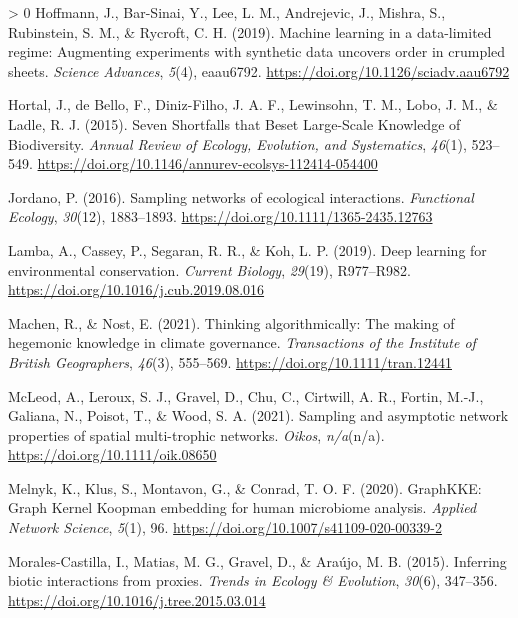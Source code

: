 \documentclass[11pt]{article}
\newlength{\cslhangindent}
\newenvironment{CSLReferences}[3] %
 {%
  \setlength{\parindent}{0pt}
  \ifodd #1 \everypar{\setlength{\hangindent}{\cslhangindent}}\ignorespaces\fi
  \ifnum #2 > 0
  \setlength{\parskip}{#2\baselineskip}
  \fi
 }%
 {}
\begin{document}
\begin{CSLReferences}{1}{0}
\leavevmode\hypertarget{ref-Hoffmann2019MacLea}{}%
Hoffmann, J., Bar-Sinai, Y., Lee, L. M., Andrejevic, J., Mishra, S.,
Rubinstein, S. M., \& Rycroft, C. H. (2019). Machine learning in a
data-limited regime: Augmenting experiments with synthetic data uncovers
order in crumpled sheets. \emph{Science Advances}, \emph{5}(4),
eaau6792. \url{https://doi.org/10.1126/sciadv.aau6792}

\leavevmode\hypertarget{ref-Hortal2015SevSho}{}%
Hortal, J., de Bello, F., Diniz-Filho, J. A. F., Lewinsohn, T. M., Lobo,
J. M., \& Ladle, R. J. (2015). Seven Shortfalls that Beset Large-Scale
Knowledge of Biodiversity. \emph{Annual Review of Ecology, Evolution,
and Systematics}, \emph{46}(1), 523--549.
\url{https://doi.org/10.1146/annurev-ecolsys-112414-054400}

\leavevmode\hypertarget{ref-Jordano2016SamNet}{}%
Jordano, P. (2016). Sampling networks of ecological interactions.
\emph{Functional Ecology}, \emph{30}(12), 1883--1893.
\url{https://doi.org/10.1111/1365-2435.12763}

\leavevmode\hypertarget{ref-Lamba2019DeeLea}{}%
Lamba, A., Cassey, P., Segaran, R. R., \& Koh, L. P. (2019). Deep
learning for environmental conservation. \emph{Current Biology},
\emph{29}(19), R977--R982.
\url{https://doi.org/10.1016/j.cub.2019.08.016}

\leavevmode\hypertarget{ref-Machen2021ThiAlg}{}%
Machen, R., \& Nost, E. (2021). Thinking algorithmically: The making of
hegemonic knowledge in climate governance. \emph{Transactions of the
Institute of British Geographers}, \emph{46}(3), 555--569.
\url{https://doi.org/10.1111/tran.12441}

\leavevmode\hypertarget{ref-McLeod2021SamAsy}{}%
McLeod, A., Leroux, S. J., Gravel, D., Chu, C., Cirtwill, A. R., Fortin,
M.-J., Galiana, N., Poisot, T., \& Wood, S. A. (2021). Sampling and
asymptotic network properties of spatial multi-trophic networks.
\emph{Oikos}, \emph{n/a}(n/a). \url{https://doi.org/10.1111/oik.08650}

\leavevmode\hypertarget{ref-Melnyk2020GraGra}{}%
Melnyk, K., Klus, S., Montavon, G., \& Conrad, T. O. F. (2020).
GraphKKE: Graph Kernel Koopman embedding for human microbiome analysis.
\emph{Applied Network Science}, \emph{5}(1), 96.
\url{https://doi.org/10.1007/s41109-020-00339-2}

\leavevmode\hypertarget{ref-Morales-Castilla2015InfBio}{}%
Morales-Castilla, I., Matias, M. G., Gravel, D., \& Araújo, M. B.
(2015). Inferring biotic interactions from proxies. \emph{Trends in
Ecology \& Evolution}, \emph{30}(6), 347--356.
\url{https://doi.org/10.1016/j.tree.2015.03.014}


\end{CSLReferences}
\end{document}
